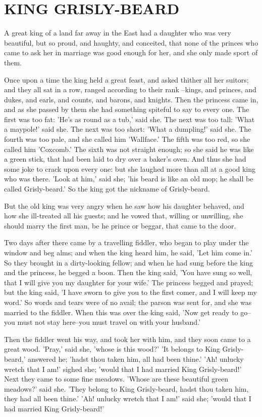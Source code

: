 \documentclass[12pt]{book}
\begin{document}
\chapter{KING GRISLY-BEARD}

A great king of a land far away in the East had a daughter who was
very beautiful, but so proud, and haughty, and conceited, that none of
the princes who came to ask her in marriage was good enough for her,
and she only made sport of them.

Once upon a time the king held a great feast, and asked thither all
her suitors; and they all sat in a row, ranged according to their rank
--kings, and princes, and dukes, and earls, and counts, and barons,
and knights. Then the princess came in, and as she passed by them she
had something spiteful to say to every one. The first was too fat:
'He's as round as a tub,' said she. The next was too tall: 'What a
maypole!' said she. The next was too short: 'What a dumpling!' said
she. The fourth was too pale, and she called him 'Wallface.' The fifth
was too red, so she called him 'Coxcomb.' The sixth was not straight
enough; so she said he was like a green stick, that had been laid to
dry over a baker's oven. And thus she had some joke to crack upon
every one: but she laughed more than all at a good king who was there.
'Look at him,' said she; 'his beard is like an old mop; he shall be
called Grisly-beard.' So the king got the nickname of Grisly-beard.

But the old king was very angry when he saw how his daughter behaved,
and how she ill-treated all his guests; and he vowed that, willing or
unwilling, she should marry the first man, be he prince or beggar,
that came to the door.

Two days after there came by a travelling fiddler, who began to play
under the window and beg alms; and when the king heard him, he said,
'Let him come in.' So they brought in a dirty-looking fellow; and when
he had sung before the king and the princess, he begged a boon. Then
the king said, 'You have sung so well, that I will give you my
daughter for your wife.' The princess begged and prayed; but the king
said, 'I have sworn to give you to the first comer, and I will keep my
word.' So words and tears were of no avail; the parson was sent for,
and she was married to the fiddler. When this was over the king said,
'Now get ready to go--you must not stay here--you must travel on with
your husband.'

Then the fiddler went his way, and took her with him, and they soon
came to a great wood. 'Pray,' said she, 'whose is this wood?' 'It
belongs to King Grisly-beard,' answered he; 'hadst thou taken him, all
had been thine.' 'Ah! unlucky wretch that I am!' sighed she; 'would
that I had married King Grisly-beard!' Next they came to some fine
meadows. 'Whose are these beautiful green meadows?' said she. 'They
belong to King Grisly-beard, hadst thou taken him, they had all been
thine.' 'Ah! unlucky wretch that I am!' said she; 'would that I had
married King Grisly-beard!'
\end{document}

